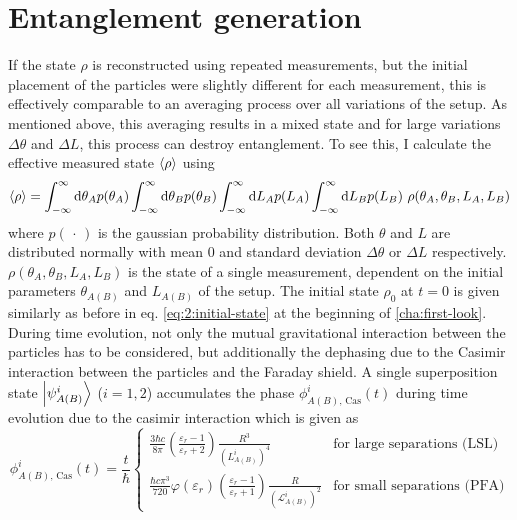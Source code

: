\section{Entanglement generation}\label{sec:4:entanglement-generation}
If the state $\rho$ is reconstructed using repeated measurements, but the initial placement of the particles were slightly different for each measurement, this is effectively comparable to an averaging process over all variations of the setup.
As mentioned above, this averaging results in a mixed state and for large variations $\Delta \theta$ and $\Delta L$, this process can destroy entanglement.
To see this, I calculate the effective measured state $\left\langle\rho\right\rangle$ using
\begin{equation}\label{eq:4:average-density}
  \left\langle\rho\right\rangle = \int_{-\infty}^{\infty} \dd \theta_A p(\theta_A) \int_{-\infty}^{\infty} \dd \theta_B p(\theta_B) \int_{-\infty}^{\infty} \dd L_A p(L_A) \int_{-\infty}^{\infty} \dd L_B p(L_B) \ \rho(\theta_A, \theta_B, L_A, L_B)
\end{equation} 
where $p(\,\cdot\,)$ is the gaussian probability distribution. Both $\theta$ and $L$ are distributed normally with mean $0$ and standard deviation $\Delta \theta$ or $\Delta L$ respectively. $\rho(\theta_A, \theta_B, L_A, L_B)$ is the state of a single measurement, dependent on the initial parameters $\theta_{A(B)}$ and $L_{A(B)}$ of the setup.
The initial state $\rho_0$ at $t=0$ is given similarly as before in eq. \eqref{eq:2:initial-state} at the beginning of \cref{cha:first-look}.
During time evolution, not only the mutual gravitational interaction between the particles has to be considered, but additionally the dephasing due to the Casimir interaction between the particles and the Faraday shield.
A single superposition state $\ket{\psi^i_{A(B)}}$ ($i = 1, 2$) accumulates the phase $\phi^i_{A(B),\,\mathrm{Cas}}(t)$ during time evolution due to the casimir interaction which is given as
\begin{equation}
  \phi^i_{A(B),\,\mathrm{Cas}}(t) = \frac{t}{\hbar}
  \begin{cases}
     \frac{3 \hbar c}{8 \pi} \left(\frac{\varepsilon_r - 1}{\varepsilon_r + 2}\right) \frac{R^3}{(L^i_{A(B)})^4} & \text{for large separations (LSL)} \\
    \frac{\hbar c \pi^3}{720} \varphi(\varepsilon_r) \left(\frac{\varepsilon_r - 1}{\varepsilon_r + 1}\right) \frac{R}{(\mathscr{L}^i_{A(B)})^2} & \text{for small separations (PFA)}
  \end{cases}
\end{equation}
